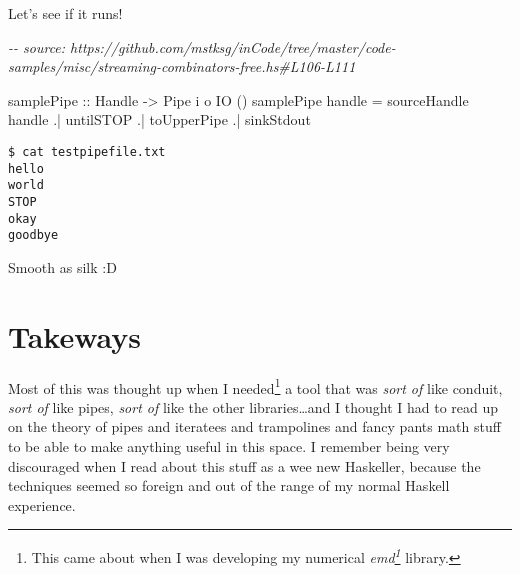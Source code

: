 \documentclass[]{article}
\newenvironment{Shaded}{}{}
\newcommand{\CommentTok}[1]{\textcolor[rgb]{0.38,0.63,0.69}{\textit{#1}}}
\newcommand{\DataTypeTok}[1]{\textcolor[rgb]{0.56,0.13,0.00}{#1}}
\newcommand{\NormalTok}[1]{#1}
\newcommand{\OperatorTok}[1]{\textcolor[rgb]{0.40,0.40,0.40}{#1}}
\newcommand{\OtherTok}[1]{\textcolor[rgb]{0.00,0.44,0.13}{#1}}
\newcommand{\StringTok}[1]{\textcolor[rgb]{0.25,0.44,0.63}{#1}}
\renewcommand{\href}[2]{#2\footnote{\url{#1}}}
\begin{document}
Let's see if it runs!

\begin{Shaded}
\begin{Highlighting}[]
\CommentTok{{-}{-} source: https://github.com/mstksg/inCode/tree/master/code{-}samples/misc/streaming{-}combinators{-}free.hs\#L106{-}L111}

\OtherTok{samplePipe ::} \DataTypeTok{Handle} \OtherTok{{-}>} \DataTypeTok{Pipe}\NormalTok{ i o }\DataTypeTok{IO}\NormalTok{ ()}
\NormalTok{samplePipe handle }\OtherTok{=}
\NormalTok{       sourceHandle handle}
    \OperatorTok{.|}\NormalTok{ untilSTOP}
    \OperatorTok{.|}\NormalTok{ toUpperPipe}
    \OperatorTok{.|}\NormalTok{ sinkStdout}
\end{Highlighting}
\end{Shaded}

\begin{verbatim}
$ cat testpipefile.txt
hello
world
STOP
okay
goodbye
\end{verbatim}

\begin{Shaded}
\end{Shaded}

Smooth as silk :D

\hypertarget{takeways}{%
\section{Takeways}\label{takeways}}

Most of this was thought up when I needed\footnote{This came about when I was
  developing my numerical
  \emph{\href{https://hackage.haskell.org/package/emd}{emd}} library.} a tool
that was \emph{sort of} like conduit, \emph{sort of} like pipes, \emph{sort of}
like the other libraries\ldots and I thought I had to read up on the theory of
pipes and iteratees and trampolines and fancy pants math stuff to be able to
make anything useful in this space. I remember being very discouraged when I
read about this stuff as a wee new Haskeller, because the techniques seemed so
foreign and out of the range of my normal Haskell experience.
\end{document}
